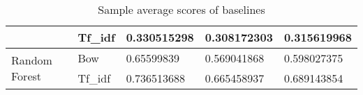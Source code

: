\begin{table}[h!]
{\begin{tabular}{@{}lllll@{}}
\multicolumn{1}{|l|}{} &
  \multicolumn{1}{l|}{Tf\_idf} &
  \multicolumn{1}{l|}{0.330515298} &
  \multicolumn{1}{l|}{0.308172303} &
  \multicolumn{1}{l|}{0.315619968} \\ \midrule
\multicolumn{1}{|l|}{\multirow{2}{*}{Random Forest}} &
  \multicolumn{1}{l|}{Bow} &
  \multicolumn{1}{l|}{0.65599839} &
  \multicolumn{1}{l|}{0.569041868} &
  \multicolumn{1}{l|}{0.598027375} \\ \cmidrule(l){2-5} 
\multicolumn{1}{|l|}{} &
  \multicolumn{1}{l|}{Tf\_idf} &
  \multicolumn{1}{l|}{0.736513688} &
  \multicolumn{1}{l|}{0.665458937} &
  \multicolumn{1}{l|}{0.689143854} \\ \bottomrule
\end{tabular}%
}
\caption{Sample average scores of baselines}
\label{tab:Sample average scores}
\end{table}

